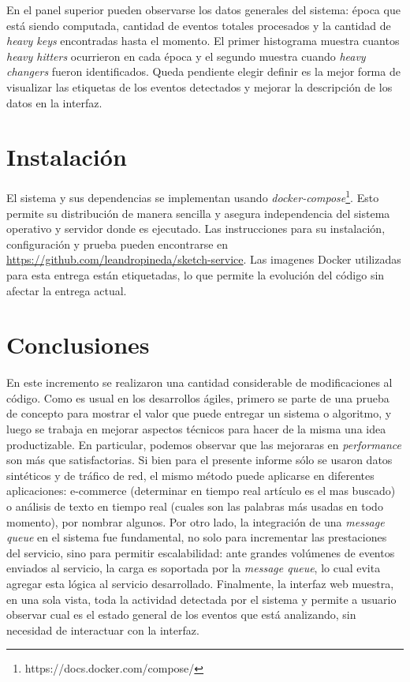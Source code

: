 \documentclass[a4paper,10pt, oneside]{article}
\begin{document}
En el panel superior pueden observarse los datos generales del sistema: época que está siendo computada, cantidad de eventos totales procesados y la cantidad de \textit{heavy keys} encontradas hasta el momento. El primer histograma muestra cuantos \textit{heavy hitters} ocurrieron en cada época y el segundo muestra cuando \textit{heavy changers} fueron identificados. Queda pendiente elegir definir es la mejor forma de visualizar las etiquetas de los eventos detectados y mejorar la descripción de los datos en la interfaz.

\section{Instalación}
El sistema y sus dependencias se implementan usando \textit{docker-compose}\footnote{https://docs.docker.com/compose/}. Esto permite su distribución de manera sencilla y asegura independencia del sistema operativo y servidor donde es ejecutado. Las instrucciones para su instalación, configuración y prueba pueden encontrarse en \hyperref[https://github.com/leandropineda/sketch-service]{https://github.com/leandropineda/sketch-service}. Las imagenes Docker utilizadas para esta entrega están etiquetadas, lo que permite la evolución del código sin afectar la entrega actual.


\section{Conclusiones}
En este incremento se realizaron una cantidad considerable de modificaciones al código. Como es usual en los desarrollos ágiles, primero se parte de una prueba de concepto para mostrar el valor que puede entregar un sistema o algoritmo, y luego se trabaja en mejorar aspectos técnicos para hacer de la misma una idea productizable.
En particular, podemos observar que las mejoraras en \textit{performance} son más que satisfactorias. Si bien para el presente informe sólo se usaron datos sintéticos y de tráfico de red, el mismo método puede aplicarse en diferentes aplicaciones: e-commerce (determinar en tiempo real artículo es el mas buscado) o análisis de texto en tiempo real (cuales son las palabras más usadas en todo momento), por nombrar algunos.
Por otro lado, la integración de una \textit{message queue} en el sistema fue fundamental, no solo para incrementar las prestaciones del servicio, sino para permitir escalabilidad: ante grandes volúmenes de eventos enviados al servicio, la carga es soportada por la \textit{message queue}, lo cual evita agregar esta lógica al servicio desarrollado.
Finalmente, la interfaz web muestra, en una sola vista, toda la actividad detectada por el sistema y permite a usuario observar cual es el estado general de los eventos que está analizando, sin necesidad de interactuar con la interfaz.
\newpage
\nocite{*}
\printbibliography
\end{document}
